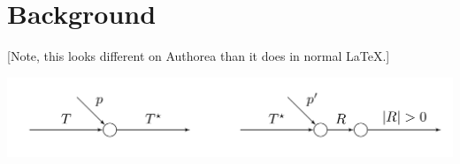 \section{Background}

[Note, this looks different on Authorea than it does in normal LaTeX.]



% 
{\centering
\includegraphics[width=.8\textwidth]{schematic}
\par}


